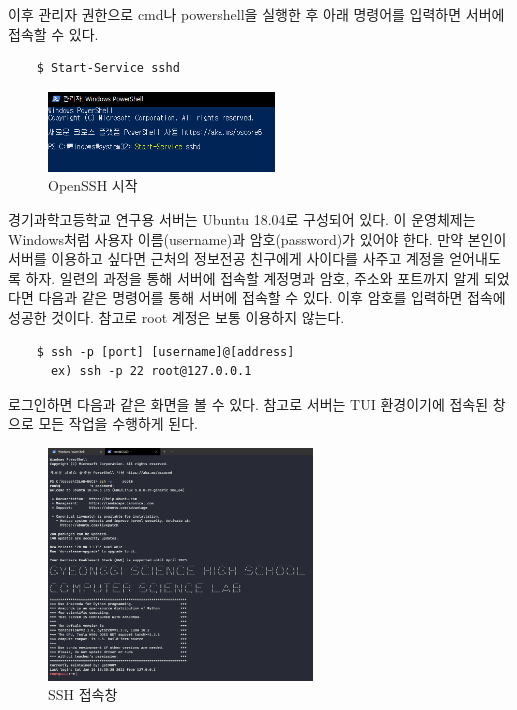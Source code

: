     이후 관리자 권한으로 cmd나 powershell을 실행한 후 아래 명령어를 입력하면 서버에 접속할 수 있다.
    \begin{lstlisting}
    $ Start-Service sshd
    \end{lstlisting}
    \begin{figure}[H]
	\begin{center}
        \includegraphics[width=6cm]{ssh4.png}
        \caption{OpenSSH 시작}
    \end{center}
    \end{figure}

	경기과학고등학교 연구용 서버는 Ubuntu 18.04로 구성되어 있다. 이 운영체제는 Windows처럼 사용자 이름(username)과 암호(password)가 있어야 한다. 만약 본인이 서버를 이용하고 싶다면 근처의 정보전공 친구에게 사이다를 사주고 계정을 얻어내도록 하자. 일련의 과정을 통해 서버에 접속할 계정명과 암호, 주소와 포트까지 알게 되었다면 다음과 같은 명령어를 통해 서버에 접속할 수 있다. 이후 암호를 입력하면 접속에 성공한 것이다. 참고로 root 계정은 보통 이용하지 않는다.\\
	\begin{lstlisting}
    $ ssh -p [port] [username]@[address]
      ex) ssh -p 22 root@127.0.0.1
    \end{lstlisting}
    
    
   로그인하면 다음과 같은 화면을 볼 수 있다. 참고로 서버는 TUI 환경이기에 접속된 창으로 모든 작업을 수행하게 된다.
    \begin{figure}[H]
	\begin{center}
        \includegraphics[width=7cm]{ssh5.png}
        \caption{SSH 접속창}
    \end{center}
    \end{figure}
	
